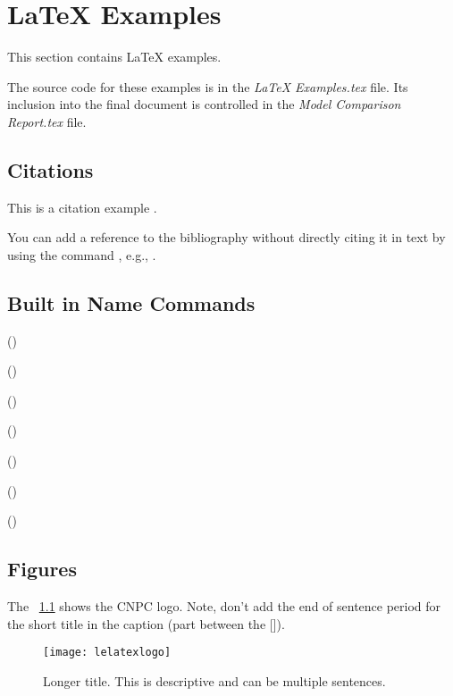 \chapter{\LaTeX{} Examples}
This section contains \LaTeX{} examples.  

The source code for these examples is in the \textit{LaTeX Examples.tex} file.  Its inclusion into the final document is controlled in the \textit{Model Comparison Report.tex} file.

\section{Citations}
This is a citation example .
~\cite{ref:aarsnes2017a}

You can add a reference to the bibliography without directly citing it in text by using the command , e.g., .

\section{Built in Name Commands}
\begin{bulletedlist}
	\item {} ()
	\item \figurename{} ()
	\item \tablename{} ()
	\item \equationname{} ()
	\item \chaptername{} ()
	\item \appendixname{} ()
	\item \sectionname{} ()
\end{bulletedlist}

\section{Figures}
The \figurename~\ref{fig:lelatexlogo} shows the CNPC logo.  Note, don't add the end of sentence period for the short title in the caption (part between the []).
\begin{figure}
	\centering
	\texttt{[image: lelatexlogo]}
	\caption[Short title for list of figures]{Longer title.  This is descriptive and can be multiple sentences.}
	\label{fig:lelatexlogo}
\end{figure}

